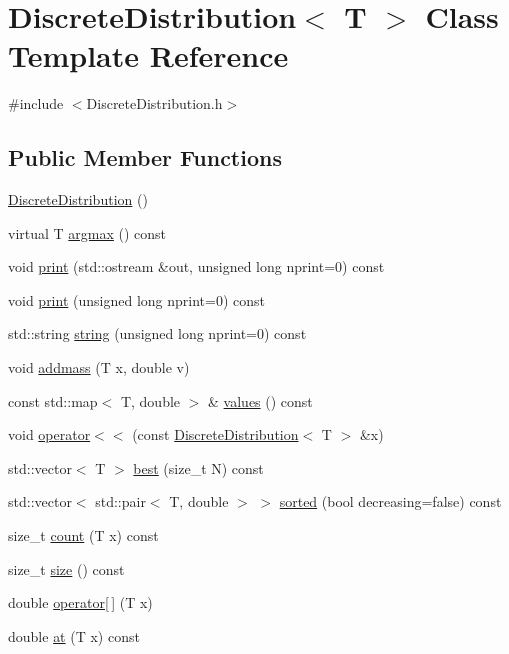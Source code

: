 \hypertarget{class_discrete_distribution}{}\section{Discrete\+Distribution$<$ T $>$ Class Template Reference}
\label{class_discrete_distribution}


{\ttfamily \#include $<$Discrete\+Distribution.\+h$>$}

\subsection*{Public Member Functions}
\begin{DoxyCompactItemize}
\item 
\hyperlink{class_discrete_distribution_a8ffb7c55f85cf42af7aec6deb97ec4ab}{Discrete\+Distribution} ()
\item 
virtual T \hyperlink{class_discrete_distribution_a7cf660223fe0f86b61e3b33268204c06}{argmax} () const
\item 
void \hyperlink{class_discrete_distribution_a6ec6f590a3659c8bef32aaab77a8052e}{print} (std\+::ostream \&out, unsigned long nprint=0) const
\item 
void \hyperlink{class_discrete_distribution_a58bc689015e6b594ed1a53130758ba6f}{print} (unsigned long nprint=0) const
\item 
std\+::string \hyperlink{class_discrete_distribution_a87d866919f4698e488aee9ce4bc42ed5}{string} (unsigned long nprint=0) const
\item 
void \hyperlink{class_discrete_distribution_a6c41c7f4726019bc213d37d4e3cdea27}{addmass} (T x, double v)
\item 
const std\+::map$<$ T, double $>$ \& \hyperlink{class_discrete_distribution_a995377a760a6fe0d44077892053acdbb}{values} () const
\item 
void \hyperlink{class_discrete_distribution_a5c93983e2375a2353b10b82ebb11f751}{operator$<$$<$} (const \hyperlink{class_discrete_distribution}{Discrete\+Distribution}$<$ T $>$ \&x)
\item 
std\+::vector$<$ T $>$ \hyperlink{class_discrete_distribution_adee72a8e4c93aa03d841c0c73d6b5498}{best} (size\+\_\+t N) const
\item 
std\+::vector$<$ std\+::pair$<$ T, double $>$ $>$ \hyperlink{class_discrete_distribution_a94488cfd094f6cde47f15a1f4c7cdbb9}{sorted} (bool decreasing=false) const
\item 
size\+\_\+t \hyperlink{class_discrete_distribution_afd3fd83dc776f5616e826de18093328b}{count} (T x) const
\item 
size\+\_\+t \hyperlink{class_discrete_distribution_ad74207d32c2ed6c5c26b3f991f4fedba}{size} () const
\item 
double \hyperlink{class_discrete_distribution_aa06afa5c16edf065b1567ea7b6b4356a}{operator\mbox{[}$\,$\mbox{]}} (T x)
\item 
double \hyperlink{class_discrete_distribution_acb11f1cfbf4ef039c538f06cde8249fd}{at} (T x) const
\end{DoxyCompactItemize}
